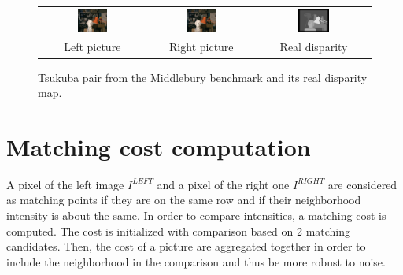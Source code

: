 \documentclass{ipol}
\begin{document}
\begin{figure}[h]
\begin{center}	
\begin{tabular}{ccc}
\includegraphics[width=0.3\textwidth]{Images/pictures/tsukuba.png} &
\includegraphics[width=0.3\textwidth]{Images/tsukuba/right.png} &
\includegraphics[width=0.3\textwidth]{Images/true_disparity/tsukuba.png}
\\
Left picture & Right picture & Real disparity
\end{tabular}
	\caption{Tsukuba pair from the Middlebury benchmark \cite{middleBench} and its real disparity map.}
\end{center}
\end{figure}

\newpage

\section{Matching cost computation}

A pixel of the left image $I^{LEFT}$ and a pixel of the right one $I^{RIGHT}$ are considered as matching points if they are on the same row and if their neighborhood intensity is about the same. In order to compare intensities, a matching cost is computed. The cost is initialized with comparison based on 2 matching candidates. Then, the cost of a picture are aggregated together in order to include the neighborhood in the comparison and thus be more robust to noise. 
\end{document}

